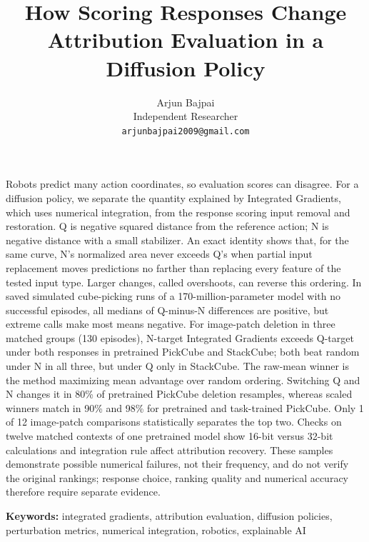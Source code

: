 \documentclass[12pt,letterpaper]{article}
\title{How Scoring Responses Change Attribution Evaluation in a Diffusion Policy}
\author{}
\author{Arjun Bajpai\\Independent Researcher\\\texttt{arjunbajpai2009@gmail.com}}
\date{}
\makeatletter
\renewenvironment{abstract}{\begin{center}\textbf{\abstractname}\end{center}\noindent\ignorespaces}{\par}
\renewcommand\section{\@startsection{section}{1}{\z@}{10pt}{4pt}{\normalfont\normalsize\bfseries}}
\makeatother
\begin{document}
\setlength{\abovedisplayskip}{6pt plus 2pt minus 2pt}
\setlength{\belowdisplayskip}{6pt plus 2pt minus 2pt}
\setlength{\abovedisplayshortskip}{3pt plus 2pt}
\setlength{\belowdisplayshortskip}{4pt plus 2pt minus 2pt}
\maketitle

\begin{abstract}
Robots predict many action coordinates, so evaluation scores can disagree. For a diffusion policy, we separate the quantity explained by Integrated Gradients, which uses numerical integration, from the response scoring input removal and restoration. Q is negative squared distance from the reference action; N is negative distance with a small stabilizer. An exact identity shows that, for the same curve, N's normalized area never exceeds Q's when partial input replacement moves predictions no farther than replacing every feature of the tested input type. Larger changes, called overshoots, can reverse this ordering. In saved simulated cube-picking runs of a 170-million-parameter model with no successful episodes, all medians of Q-minus-N differences are positive, but extreme calls make most means negative. For image-patch deletion in three matched groups (130 episodes), N-target Integrated Gradients exceeds Q-target under both responses in pretrained PickCube and StackCube; both beat random under N in all three, but under Q only in StackCube. The raw-mean winner is the method maximizing mean advantage over random ordering. Switching Q and N changes it in 80\% of pretrained PickCube deletion resamples, whereas scaled winners match in 90\% and 98\% for pretrained and task-trained PickCube. Only 1 of 12 image-patch comparisons statistically separates the top two. Checks on twelve matched contexts of one pretrained model show 16-bit versus 32-bit calculations and integration rule affect attribution recovery. These samples demonstrate possible numerical failures, not their frequency, and do not verify the original rankings; response choice, ranking quality and numerical accuracy therefore require separate evidence.
\end{abstract}

\textbf{Keywords:} integrated gradients, attribution evaluation, diffusion policies, perturbation metrics, numerical integration, robotics, explainable AI

\section{Introduction}
\end{document}

